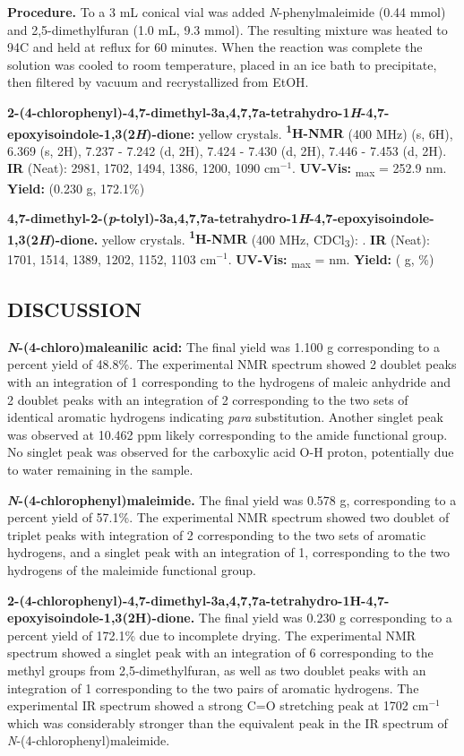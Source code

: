 \documentclass[11pt]{article}
\let\bf\textbf
\begin{document}
\bf{Procedure.} To a 3 mL conical vial was added \textit{N}-phenylmaleimide (0.44 mmol) and 2,5-dimethylfuran (1.0 mL, 9.3 mmol). The resulting mixture was heated to 94\degree C and held at reflux for 60 minutes. When the reaction was complete the solution was cooled to room temperature, placed in an ice bath to precipitate, then filtered by vacuum and recrystallized from EtOH. 

\bf{2-(4-chlorophenyl)-4,7-dimethyl-3a,4,7,7a-tetrahydro-1\textit{H}-4,7-epoxyisoindole-1,3(2\textit{H})-dione:} yellow crystals. \bf{\textsuperscript{1}H-NMR} (400 MHz) \textdelta{} (s, 6H), 6.369 (s, 2H), 7.237 - 7.242 (d, 2H), 7.424 - 7.430 (d, 2H), 7.446 - 7.453 (d, 2H). \bf{IR} (Neat): 2981, 1702, 1494, 1386, 1200, 1090 cm$^{-1}$. \bf{UV-Vis:} \textlambda\textsubscript{max} = 252.9 nm. \bf{Yield:} (0.230 g, 172.1\%)

\bf{4,7-dimethyl-2-(\textit{p}-tolyl)-3a,4,7,7a-tetrahydro-1\textit{H}-4,7-epoxyisoindole-1,3(2\textit{H})-dione.} yellow crystals. \bf{\textsuperscript{1}H-NMR} (400 MHz, CDCl\textsubscript{3}): \textdelta\; . \bf{IR} (Neat): 1701, 1514, 1389, 1202, 1152, 1103 cm$^{-1}$. \bf{UV-Vis:} \textlambda\textsubscript{max} = nm. \bf{Yield:} ( g, \%)

\subsection*{DISCUSSION}
\bf{\textit{N}-(4-chloro)maleanilic acid:} The final yield was 1.100 g corresponding to a percent yield of 48.8\%. The experimental NMR spectrum showed 2 doublet peaks with an integration of 1 corresponding to the hydrogens of maleic anhydride and 2 doublet peaks with an integration of 2 corresponding to the two sets of identical aromatic hydrogens indicating \textit{para} substitution. Another singlet peak was observed at 10.462 ppm likely corresponding to the amide functional group. No singlet peak was observed for the carboxylic acid O-H proton, potentially due to water remaining in the sample.

\bf{\textit{N}-(4-chlorophenyl)maleimide.} The final yield was 0.578 g, corresponding to a percent yield of 57.1\%. The experimental NMR spectrum showed two doublet of triplet peaks with integration of 2 corresponding to the two sets of aromatic hydrogens, and a singlet peak with an integration of 1, corresponding to the two hydrogens of the maleimide functional group. 

\bf{2-(4-chlorophenyl)-4,7-dimethyl-3a,4,7,7a-tetrahydro-1H-4,7-epoxyisoindole-1,3(2H)-dione.} The final yield was 0.230 g corresponding to a percent yield of 172.1\% due to incomplete drying. The experimental NMR spectrum showed a singlet peak with an integration of 6 corresponding to the methyl groups from 2,5-dimethylfuran, as well as two doublet peaks with an integration of 1 corresponding to the two pairs of aromatic hydrogens. The experimental IR spectrum showed a strong C=O stretching peak at 1702 cm$^{-1}$ which was considerably stronger than the equivalent peak in the IR spectrum of \textit{N}-(4-chlorophenyl)maleimide. 
\end{document}
